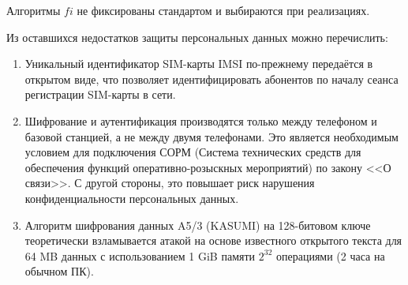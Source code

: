 Алгоритмы $fi$ не фиксированы стандартом и выбираются при реализациях.

Из оставшихся недостатков защиты персональных данных можно перечислить:
\begin{enumerate}
    \item Уникальный идентификатор SIM-карты IMSI по-прежнему передаётся в открытом виде, что позволяет идентифицировать абонентов по началу сеанса регистрации SIM-карты в сети.
    \item Шифрование и аутентификация производятся только между телефоном и базовой станцией, а не между двумя телефонами. Это является необходимым условием для подключения СОРМ (Система технических средств для обеспечения функций оперативно-розыскных мероприятий) по закону <<О связи>>. С другой стороны, это повышает риск нарушения конфиденциальности персональных данных.
    \item Алгоритм шифрования данных A5/3 (KASUMI) на 128-битовом ключе теоретически взламывается атакой на основе известного открытого текста для 64 MB данных с использованием 1 GiB памяти $2^{32}$ операциями (2 часа на обычном ПК).
\end{enumerate}
